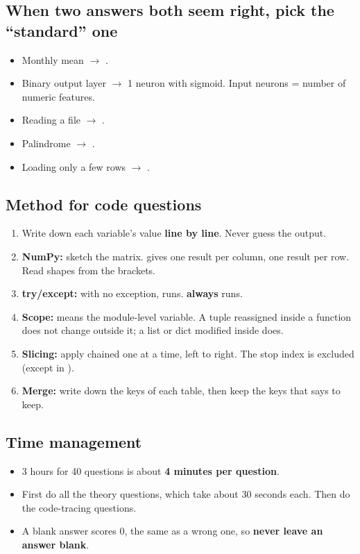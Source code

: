 \subsection{When two answers both seem right, pick the ``standard'' one}
\begin{itemize}
  \item Monthly mean $\to$ .
  \item Binary output layer $\to$ 1 neuron with sigmoid. Input neurons = number of numeric features.
  \item Reading a file $\to$ .
  \item Palindrome $\to$ .
  \item Loading only a few rows $\to$ .
\end{itemize}

\subsection{Method for code questions}
\begin{enumerate}
  \item Write down each variable's value \textbf{line by line}. Never guess the output.
  \item \textbf{NumPy:} sketch the matrix.  gives one result per column,  one result per row. Read shapes from the brackets.
  \item \textbf{try/except:} with no exception,  runs.  \textbf{always} runs.
  \item \textbf{Scope:}  means the module-level variable. A tuple reassigned inside a function does not change outside it; a list or dict modified inside does.
  \item \textbf{Slicing:} apply chained \code{[ ][ ][::2]} one at a time, left to right. The stop index is excluded (except in ).
  \item \textbf{Merge:} write down the keys of each table, then keep the keys that  says to keep.
\end{enumerate}

\subsection{Time management}
\begin{itemize}
  \item 3 hours for 40 questions is about \textbf{4 minutes per question}.
  \item First do all the theory questions, which take about 30 seconds each. Then do the code-tracing questions.
  \item A blank answer scores 0, the same as a wrong one, so \textbf{never leave an answer blank}.
\end{itemize}

